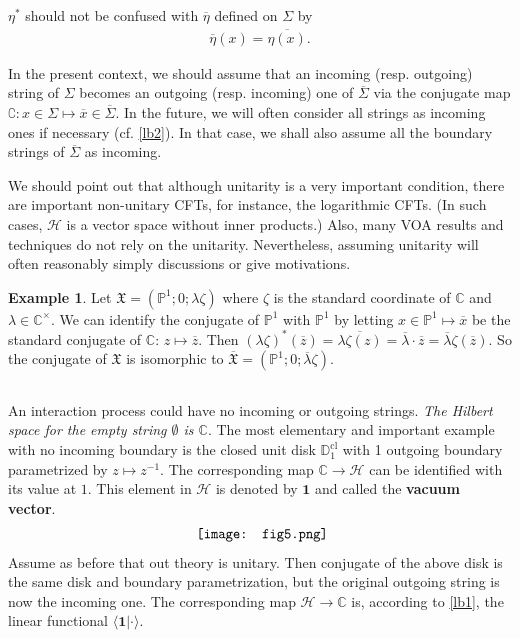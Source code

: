 \documentclass[11pt,b5paper,notitlepage]{article}
\theoremstyle{definition}
\newtheorem{eg}[df]{Example}
\theoremstyle{plain}
\newcommand{\fk}{\mathfrak}
\newcommand{\mc}{\mathcal}
\newcommand{\ovl}{\overline}
\newcommand{\id}{\mathbf{1}}
\newcommand{\bk}[1]{\langle {#1}\rangle}
\newcommand{\Co}{\complement}
\newcommand{\Cbb}{\mathbb C}
\newcommand{\Pbb}{\mathbb P}
\newcommand{\Dbb}{\mathbb D}
\newcommand{\cl}{\mathrm{cl}}
\numberwithin{equation}{section}
\begin{document}
$\eta^*$ should not be confused with $\ovl \eta$ defined on $\Sigma$ by
\begin{align*}
\ovl \eta(x)=\ovl{\eta(x)}.
\end{align*}



In the present context, we should assume that an incoming (resp. outgoing) string of $\Sigma$ becomes an outgoing (resp. incoming) one of $\ovl\Sigma$ via the conjugate map $\Co:x\in \Sigma\mapsto\ovl x\in\ovl\Sigma$. In the future, we will often consider all strings as incoming ones if necessary (cf. \ref{lb2}). In that case, we shall also assume all the boundary strings of $\ovl\Sigma$ as incoming.

We should point out that although unitarity is a very important condition, there are important non-unitary CFTs, for instance, the logarithmic CFTs. (In such cases, $\mc H$ is a vector space without inner products.) Also, many VOA results and techniques do not rely on the unitarity. Nevertheless, assuming unitarity will often reasonably simply discussions or give motivations.


\begin{eg}
Let $\fk X=(\Pbb^1;0;\lambda \zeta)$ where $\zeta$ is the standard coordinate of $\Cbb$ and $\lambda\in\Cbb^\times$. We can identify the conjugate of $\Pbb^1$ with $\Pbb^1$ by letting $x\in\Pbb^1\mapsto \ovl x$ be the standard conjugate of $\Cbb$: $z\mapsto \ovl z$. Then $(\lambda\zeta)^*(\ovl z)=\ovl{\lambda\zeta(z)}=\ovl\lambda\cdot\ovl z=\ovl\lambda\zeta(\ovl z)$. So the conjugate of $\fk X$ is isomorphic to $\ovl{\fk X}=(\Pbb^1;0;\ovl\lambda\zeta)$.	
\end{eg}	




\subsection{}\label{lb23}

An interaction process could have no incoming or outgoing strings. \emph{The Hilbert space for the empty string $\emptyset$ is $\Cbb$}. The most elementary and important example with no incoming boundary is the closed unit  disk $\Dbb_1^\cl$ with 1 outgoing boundary parametrized by $z\mapsto z^{-1}$. The corresponding map $\Cbb\rightarrow \mc H$ can be identified with its value at $1$. This element in $\mc H$ is denoted by $\id$ \index{1@$\id$, the vacuum vector} and called the \textbf{vacuum vector}.
\begin{align}
	\vcenter{\hbox{{
				\texttt{[image: fig5.png]}}}}\label{eq27}
\end{align}
Assume as before that out theory is unitary. Then conjugate of the above disk is the same disk and boundary parametrization, but the original outgoing string is now the incoming one. The corresponding map $\mc H\rightarrow \Cbb$ is, according to \ref{lb1}, the linear functional $\bk{\id|\cdot}$. 
\end{document}
